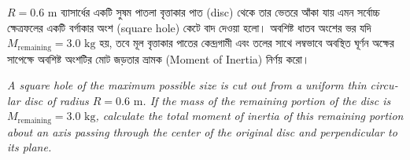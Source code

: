 \documentclass[12pt, a4paper]{article}
\begin{document}
\begin{tcolorbox}[questionbox={প্রশ্ন (Question)15}]
\noindent
$R = 0.6\text{ m}$ ব্যাসার্ধের একটি সুষম পাতলা বৃত্তাকার পাত (disc) থেকে তার ভেতরে আঁকা যায় এমন সর্বোচ্চ ক্ষেত্রফলের একটি বর্গাকার অংশ (square hole) কেটে বাদ দেওয়া হলো। অবশিষ্ট ধাতব অংশের ভর যদি $M_{\text{remaining}} = 3.0\text{ kg}$ হয়, তবে মূল বৃত্তাকার পাতের কেন্দ্রগামী এবং তলের সাথে লম্বভাবে অবস্থিত ঘূর্ণন অক্ষের সাপেক্ষে অবশিষ্ট অংশটির মোট জড়তার ভ্রামক (Moment of Inertia) নির্ণয় করো।

\vspace{0.8em}
\begin{english}
\noindent\textit{\color{darkgray}
A square hole of the maximum possible size is cut out from a uniform thin circular disc of radius $R = 0.6\text{ m}$. If the mass of the remaining portion of the disc is $M_{\text{remaining}} = 3.0\text{ kg}$, calculate the total moment of inertia of this remaining portion about an axis passing through the center of the original disc and perpendicular to its plane.
}
\end{english}
\end{tcolorbox}


\vspace{1.5em}
\begin{center}
\end{center}
\vspace{1em}
\end{document}
